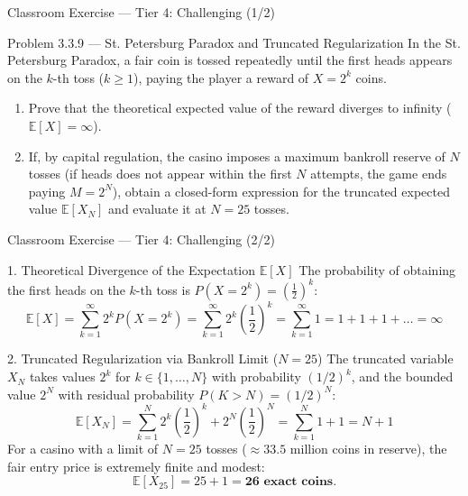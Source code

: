 \documentclass[aspectratio=169,xcolor={dvipsnames,table}]{beamer}
\begin{document}
\begin{frame}{Classroom Exercise --- Tier 4: Challenging (1/2)}
	\begin{block}{Problem 3.3.9 --- St. Petersburg Paradox and Truncated Regularization}
		\footnotesize
		In the St. Petersburg Paradox, a fair coin is tossed repeatedly until the first heads appears on the $k$-th toss ($k \ge 1$), paying the player a reward of $X = 2^k$ coins.
		\begin{enumerate}\itemsep=0.12cm
			\item Prove that the theoretical expected value of the reward diverges to infinity ($\mathbb{E}[X] = \infty$).
			\item If, by capital regulation, the casino imposes a maximum bankroll reserve of $N$ tosses (if heads does not appear within the first $N$ attempts, the game ends paying $M = 2^N$), obtain a closed-form expression for the truncated expected value $\mathbb{E}[X_N]$ and evaluate it at $N = 25$ tosses.
		\end{enumerate}
	\end{block}
\end{frame}

\begin{frame}{Classroom Exercise --- Tier 4: Challenging (2/2)}
	\fontsize{7.5pt}{9pt}\selectfont
	\begin{block}{1. Theoretical Divergence of the Expectation $\mathbb{E}[X]$}
		\fontsize{7.5pt}{9pt}\selectfont
		The probability of obtaining the first heads on the $k$-th toss is $P(X=2^k) = \left(\frac{1}{2}\right)^k$:
		$$\mathbb{E}[X] = \sum_{k=1}^\infty 2^k P(X = 2^k) = \sum_{k=1}^\infty 2^k \left(\dfrac{1}{2}\right)^k = \sum_{k=1}^\infty 1 = 1 + 1 + 1 + \dots = \mathbf{\infty}$$
	\end{block}

	\vspace{-0.2cm}
	\pause
	\begin{alertblock}{2. Truncated Regularization via Bankroll Limit ($N=25$)}
		\fontsize{7.5pt}{9pt}\selectfont
		The truncated variable $X_N$ takes values $2^k$ for $k \in \{1, \dots, N\}$ with probability $(1/2)^k$, and the bounded value $2^N$ with residual probability $P(K > N) = (1/2)^N$:
		$$\mathbb{E}[X_N] = \sum_{k=1}^N 2^k \left(\dfrac{1}{2}\right)^k + 2^N \left(\dfrac{1}{2}\right)^N = \sum_{k=1}^N 1 + 1 = N + 1$$
		For a casino with a limit of $N = 25$ tosses ($\approx 33.5$ million coins in reserve), the fair entry price is extremely finite and modest:
		$$\mathbb{E}[X_{25}] = 25 + 1 = \mathbf{26\text{ exact coins}}.$$
	\end{alertblock}
\end{frame}
\end{document}
